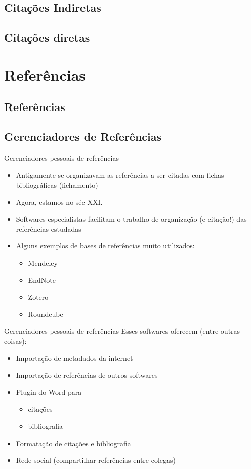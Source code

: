 \documentclass{beamer}
\begin{document}
\subsection{Citações Indiretas}

\subsection{Citações diretas}

\section{Referências}

\subsection{Referências}

\subsection{Gerenciadores de Referências}

\begin{frame}{Gerenciadores pessoais de referências}
  \begin{itemize}
  \item Antigamente se organizavam as referências a ser citadas com
    fichas bibliográficas (fichamento)
  \item Agora, estamos no séc XXI.
  \item Softwares especialistas facilitam o trabalho de organização (e
    citação!) das referências estudadas
  \item Alguns exemplos de bases de referências muito utilizados:
    \begin{itemize}
    \item<4-> \alert<5->{Mendeley}
    \item<4-> EndNote
    \item<4-> Zotero
    \item<4-> Roundcube
    \end{itemize}
  \end{itemize}
\end{frame}

\begin{frame}{Gerenciadores pessoais de referências}
  Esses softwares oferecem (entre outras coisas):
  \begin{itemize}
  \item Importação de metadados da internet
  \item Importação de referências de outros softwares
  \item Plugin do Word para
    \begin{itemize}
    \item<3-> citações
    \item<3-> bibliografia
    \end{itemize}
  \item Formatação de citações e bibliografia
  \item Rede social (compartilhar referências entre colegas)
  \end{itemize}
\end{frame}
\end{document}

